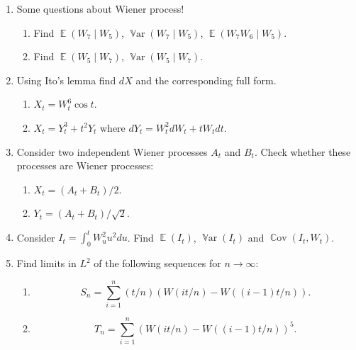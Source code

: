 \documentclass[12pt]{article}
\DeclareMathOperator{\Cov}{\mathbb{C}ov}
\DeclareMathOperator{\Var}{\mathbb{V}ar}
\DeclareMathOperator{\E}{\mathbb{E}}
\begin{document}
\begin{enumerate}

  
  \item Some questions about Wiener process!
  \begin{enumerate}
    \item Find $\E(W_7 \mid W_5)$, $\Var(W_7\mid W_5)$, $\E(W_7 W_6 \mid W_5)$.
    \item Find $\E(W_5 \mid W_7)$, $\Var(W_5\mid W_7)$.
  \end{enumerate}
  
  \item Using Ito's lemma find $dX$ and the corresponding full form.
  \begin{enumerate}
    \item $X_t = W_t^6 \cos t$.
    \item $X_t = Y_t^3 + t^2 Y_t$ where $dY_t = W_t^2 dW_t + tW_t dt$.
  \end{enumerate}


  \item Consider two independent Wiener processes $A_t$ and $B_t$.
  Check whether these processes are Wiener processes:
  \begin{enumerate}
    \item $X_t = (A_t + B_t) / 2$.
    \item $Y_t = (A_t + B_t) / \sqrt{2}$.
  \end{enumerate}

  \item Consider $I_t = \int_0^t W_u^2 u^2 du$. 
  Find $\E(I_t)$, $\Var(I_t)$ and $\Cov(I_t, W_t)$.


  \item Find limits in $L^2$ of the following sequences for $n\to \infty$:
  \begin{enumerate}
    \item 
    \[
    S_n = \sum_{i=1}^n (t/n)\left(W(it/n) - W((i-1)t/n)\right).
    \]
    \item 
    \[
      T_n = \sum_{i=1}^n \left(W(it/n) - W((i-1)t/n)\right)^5.
    \]
  \end{enumerate}
  


\end{enumerate}
\end{document}
